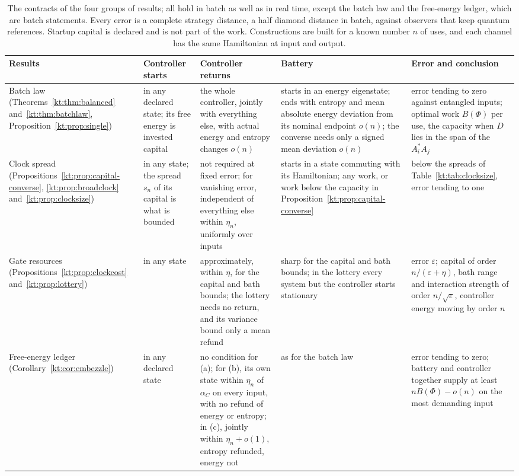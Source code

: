 \begin{table}[ht]
\centering
\small
\begin{tabular}{@{}>{\raggedright\arraybackslash}p{2.4cm}>{\raggedright\arraybackslash}p{2.3cm}>{\raggedright\arraybackslash}p{3.1cm}>{\raggedright\arraybackslash}p{3.1cm}>{\raggedright\arraybackslash}p{3.4cm}@{}}
\toprule
Results & Controller starts & Controller returns & Battery & Error and conclusion\\
\midrule
Batch law (Theorems~\ref{kt:thm:balanced} and~\ref{kt:thm:batchlaw}, Proposition~\ref{kt:prop:single}) & in any declared state; its free energy is invested capital & the whole controller, jointly with everything else, with actual energy and entropy changes $o(n)$ & starts in an energy eigenstate; ends with entropy and mean absolute energy deviation from its nominal endpoint $o(n)$; the converse needs only a signed mean deviation $o(n)$ & error tending to zero against entangled inputs; optimal work $B(\Phi)$ per use, the capacity when $D$ lies in the span of the $A_i^*A_j$\\
Clock spread (Propositions~\ref{kt:prop:capital-converse}, \ref{kt:prop:broadclock} and~\ref{kt:prop:clocksize}) & in any state; the spread $s_n$ of its capital is what is bounded & not required at fixed error; for vanishing error, independent of everything else within $\eta_n$, uniformly over inputs & starts in a state commuting with its Hamiltonian; any work, or work below the capacity in Proposition~\ref{kt:prop:capital-converse} & below the spreads of Table~\ref{kt:tab:clocksize}, error tending to one\\
Gate resources (Propositions~\ref{kt:prop:clockcost} and~\ref{kt:prop:lottery}) & in any state & approximately, within $\eta$, for the capital and bath bounds; the lottery needs no return, and its variance bound only a mean refund & sharp for the capital and bath bounds; in the lottery every system but the controller starts stationary & error $\varepsilon$; capital of order $n/(\varepsilon+\eta)$, bath range and interaction strength of order $n/\sqrt\varepsilon$, controller energy moving by order $n$\\
Free-energy ledger (Corollary~\ref{kt:cor:embezzle}) & in any declared state & no condition for (a); for (b), its own state within $\eta_n$ of $\alpha_C$ on every input, with no refund of energy or entropy; in (c), jointly within $\eta_n+o(1)$, entropy refunded, energy not & as for the batch law & error tending to zero; battery and controller together supply at least $nB(\Phi)-o(n)$ on the most demanding input\\
\bottomrule
\end{tabular}
\caption{The contracts of the four groups of results; all hold in batch as well as in real time, except the batch law and the free-energy ledger, which are batch statements. Every error is a complete strategy distance, a half diamond distance in batch, against observers that keep quantum references. Startup capital is declared and is not part of the work. Constructions are built for a known number $n$ of uses, and each channel has the same Hamiltonian at input and output.}\label{kt:tab:contract}
\end{table}

